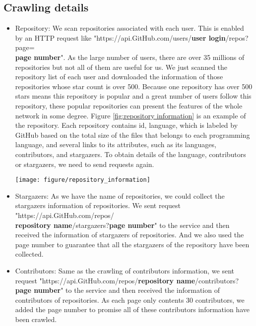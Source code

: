 \documentclass[12pt,oneside,final]{vlsithesis}
\begin{document}
\subsection{Crawling details}
\begin{itemize}
	\item Repository: We scan repositories associated with each user. This is enabled by an HTTP request like "https://api.GitHub.com/users/\textbf{user login}/repos?page=\\\textbf{page number}". As the large number of users, there are over 35 millions of repositories but not all of them are useful for us. We just scanned the repository list of each user and downloaded the information of those repositories whose star count is over 500. Because one repository has over 500 stars means this repository is popular and a great number of users follow this repository, these popular repositories can present the features of the whole network in some degree. Figure \ref{fig:repository information} is an example of the repository. Each repository contains id, language, which is labeled by GitHub based on the total size of the files that belongs to each programming language, and several links to its attributes, such as its languages, contributors, and stargazers. To obtain details of the language, contributors or stargazers, we need to send requests again.
	\begin{figure*}
		\centering
		\texttt{[image: figure/repository\_information]}
		\caption{Example of repository information}
		\label{fig:repository information}
	\end{figure*}
	\item Stargazers: As we have the name of repositories, we could collect the stargazers information of repositories. We sent request "https://api.GitHub.com/repos/\\\textbf{repository name}/stargazers?\textbf{page number}" to the service and then received the information of stargazers of repositories. And we also used the page number to guarantee that all the stargazers of the repository have been collected. 
	\item Contributors: Same as the crawling of contributors information, we sent request "https://api.GitHub.com/repos/\textbf{repository name}/contributors?\textbf{page number}" to the service and then received the information of contributors of repositories. As each page only contents 30 contributors, we added the page number to promise all of these contributors information have been crawled.

\end{itemize}
\end{document}
